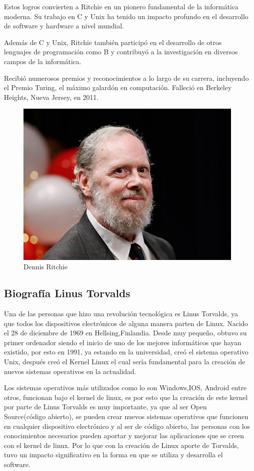 \documentclass[11pt,twoside]{book}
\begin{document}
\vspace{5pt}
Estos logros convierten a Ritchie en un pionero fundamental de la informática moderna. Su trabajo en C y Unix ha tenido un impacto profundo en el desarrollo de software y hardware a nivel mundial.

Además de C y Unix, Ritchie también participó en el desarrollo de otros lenguajes de programación como B y contribuyó a la investigación en diversos campos de la informática.

Recibió numerosos premios y reconocimientos a lo largo de su carrera, incluyendo el Premio Turing, el máximo galardón en computación. Falleció en Berkeley Heights, Nueva Jersey, en 2011.



\begin{figure}[htb]
  \centering
  \includegraphics[width=0.3\linewidth, height=0.2\textheight]{D.R.png}
  \caption{Dennis Ritchie}
  \label{fig:etiqueta}
\end{figure}

\vspace{5pt}
\newpage
\subsection{{\bfseries Biografía Linus Torvalds}} 

\vspace{5pt}
Una de las personas que hizo una revolución tecnológica es Linus Torvalds, ya que todos los dispositivos electrónicos de alguna manera parten de Linux. Nacido el 28 de diciembre de 1969 en Hellsing,Finlandia. Desde muy pequeño, obtuvo su primer ordenador siendo el inicio de uno de los mejores informáticos que hayan existido, por esto en 1991, ya estando en la universidad, creó el sistema operativo Unix, después creó el Kernel Linux el cual sería fundamental para la creación de nuevos sistemas operativos en la actualidad.

\vspace{5pt}
Los sistemas operativos más utilizados como lo son Windows,IOS, Android entre otros, funcionan bajo el kernel de linux, es por esto que la creación de este kernel por parte de Linus Torvalds es muy importante, ya que al ser Open Source(código abierto), se pueden crear nuevos sistemas operativos que funcionen en cualquier dispositivo electrónico y al ser de código abierto, las personas con los conocimientos necesarios pueden aportar y mejorar las aplicaciones que se creen con el kernel de linux. Por lo que con la creación de Linux aporte de Torvalds, tuvo un impacto significativo en la forma en que se utiliza y desarrolla el software.
\end{document}
